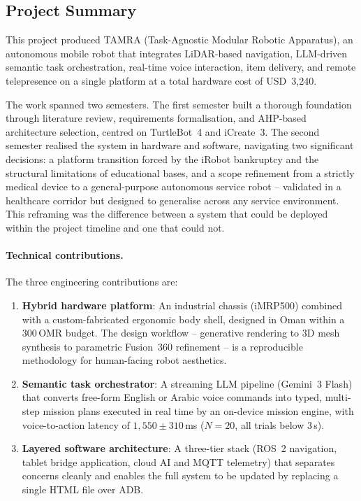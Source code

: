 
\subsection{Project Summary}

This project produced TAMRA (Task-Agnostic Modular Robotic Apparatus), an autonomous mobile robot that integrates LiDAR-based navigation, LLM-driven semantic task orchestration, real-time voice interaction, item delivery, and remote telepresence on a single platform at a total hardware cost of USD~3{,}240.

The work spanned two semesters. The first semester built a thorough foundation through literature review, requirements formalisation, and AHP-based architecture selection, centred on TurtleBot~4 and iCreate~3. The second semester realised the system in hardware and software, navigating two significant decisions: a platform transition forced by the iRobot bankruptcy and the structural limitations of educational bases, and a scope refinement from a strictly medical device to a general-purpose autonomous service robot -- validated in a healthcare corridor but designed to generalise across any service environment. This reframing was the difference between a system that could be deployed within the project timeline and one that could not.

\paragraph{Technical contributions.}
The three engineering contributions are:
\begin{enumerate}
  \item \textbf{Hybrid hardware platform}: An industrial chassis (iMRP500) combined with a custom-fabricated ergonomic body shell, designed in Oman within a 300\,OMR budget. The design workflow -- generative rendering to 3D mesh synthesis to parametric Fusion~360 refinement -- is a reproducible methodology for human-facing robot aesthetics.
  \item \textbf{Semantic task orchestrator}: A streaming LLM pipeline (Gemini~3 Flash) that converts free-form English or Arabic voice commands into typed, multi-step mission plans executed in real time by an on-device mission engine, with voice-to-action latency of $1{,}550 \pm 310$\,ms ($N=20$, all trials below 3\,s).
  \item \textbf{Layered software architecture}: A three-tier stack (ROS~2 navigation, tablet bridge application, cloud AI and MQTT telemetry) that separates concerns cleanly and enables the full system to be updated by replacing a single HTML file over ADB.
\end{enumerate}

